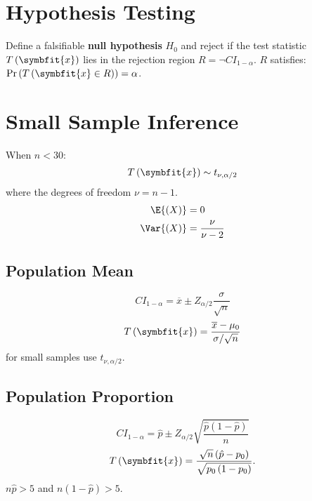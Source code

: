 \documentclass{article}
\begin{document}
\begin{multicols}{3}
    \section{Hypothesis Testing}
    Define a falsifiable \textbf{null hypothesis} \(H_0\) and reject if the test statistic \(T\left( \symbfit{x} \right)\) lies in the rejection region \(R = \neg CI_{1 - \alpha}\).
    \(R\) satisfies: \(\Pr{\left( T\left( \symbfit{x} \in R \right) \right)} = \alpha\).
    \section{Small Sample Inference}
    When \(n < 30\):
    \begin{equation*}
        T\left( \symbfit{x} \right) \sim t_{\nu,\alpha/2}
    \end{equation*}
    where the degrees of freedom \(\nu = n - 1\).
    \begin{align*}
        \E{\left( X \right)}   & = 0                   \\
        \Var{\left( X \right)} & = \frac{\nu}{\nu - 2} \\
    \end{align*}
    \subsection{Population Mean}
    \begin{equation*}
        {CI}_{1-\alpha} = \overline{x} \pm Z_{\alpha/2} \frac{\sigma}{\sqrt{n}}
    \end{equation*}
    \begin{equation*}
        T\left( \symbfit{x} \right) = \frac{\overline{x} - \mu_0}{\sigma/\sqrt{n}}
    \end{equation*}
    for small samples use \(t_{\nu,\alpha/2}\).
    \subsection{Population Proportion}
    \begin{equation*}
        {CI}_{1-\alpha} = \hat{p} \pm Z_{\alpha/2} \sqrt{\frac{\hat{p}\left( 1 - \hat{p} \right)}{n}}
    \end{equation*}
    \begin{equation*}
        T\left( \symbfit{x} \right) = \frac{\sqrt{n} \left( \hat{p} - p_0 \right)}{\sqrt{p_0 \left( 1 - p_0 \right)}}.
    \end{equation*}
    \(n \hat{p} > 5\) and \(n \left( 1 - \hat{p} \right) > 5\).

\end{multicols}
\end{document}
